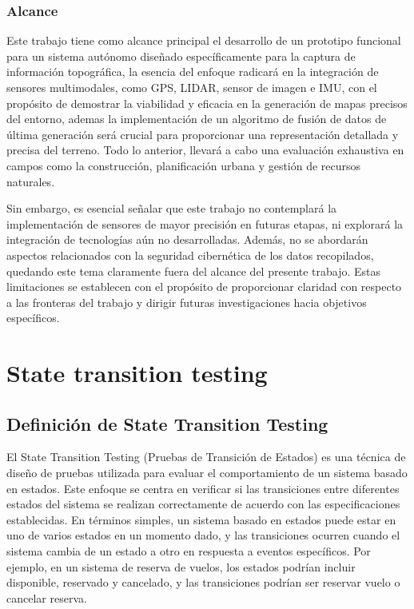 \documentclass[12pt,a4paper, twoside]{article} %
\begin{document}
\subsubsection{Alcance}
\label{subsec:org12e44a2}


Este trabajo tiene como alcance principal el desarrollo de un prototipo funcional para un sistema autónomo diseñado específicamente para la captura de información topográfica, la esencia del enfoque radicará en la integración de sensores multimodales, como GPS, LIDAR, sensor de imagen e IMU, con el propósito de demostrar la viabilidad y eficacia en la generación de mapas precisos del entorno, ademas la implementación de un algoritmo de fusión de datos de última generación será crucial para proporcionar una representación detallada y precisa del terreno. Todo lo anterior, llevará a cabo una evaluación exhaustiva en campos como la construcción, planificación urbana y gestión de recursos naturales.

Sin embargo, es esencial señalar que este trabajo no contemplará la implementación de sensores de mayor precisión en futuras etapas, ni explorará la integración de tecnologías aún no desarrolladas. Además, no se abordarán aspectos relacionados con la seguridad cibernética de los datos recopilados, quedando este tema claramente fuera del alcance del presente trabajo. Estas limitaciones se establecen con el propósito de proporcionar claridad con respecto a las fronteras del trabajo y dirigir futuras investigaciones hacia objetivos específicos.


\section{State transition testing}
\label{sec:orgc1c4017}

\subsection{Definición de State Transition Testing}
\label{sec:orgdaca22c}



El State Transition Testing (Pruebas de Transición de Estados) es una técnica de diseño de pruebas utilizada para evaluar el comportamiento de un sistema basado en estados. Este enfoque se centra en verificar si las transiciones entre diferentes estados del sistema se realizan correctamente de acuerdo con las especificaciones establecidas. En términos simples, un sistema basado en estados puede estar en uno de varios estados en un momento dado, y las transiciones ocurren cuando el sistema cambia de un estado a otro en respuesta a eventos específicos. Por ejemplo, en un sistema de reserva de vuelos, los estados podrían incluir disponible, reservado y cancelado, y las transiciones podrían ser reservar vuelo o cancelar reserva.
\end{document}
